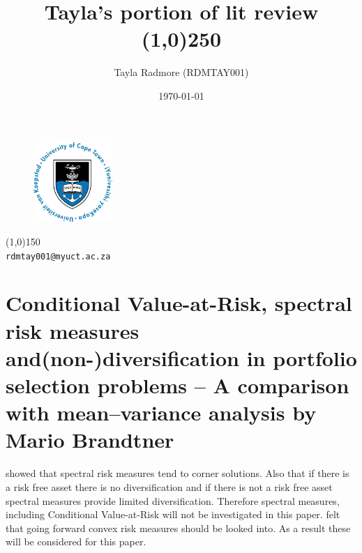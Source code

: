\documentclass[12pt,a4paper]{article}
\begin{document}
\begin{titlepage}

\title{Tayla's portion of lit review\\
\line(1,0){250}\\}

\date{\today}

\author{Tayla Radmore (RDMTAY001)}

\maketitle

\begin{figure}

\begin{center}
\includegraphics[width=3cm]{UCTlogo.jpg}\\[1cm]
\end{center}

\end{figure}

\begin{center}
\line(1,0){150}\\
{{\tt rdmtay001@myuct.ac.za}}
\end{center}

\thispagestyle{empty}

\end{titlepage}


\tableofcontents

\newpage


\section{Conditional Value-at-Risk, spectral risk measures and(non-)diversification in portfolio selection problems – A comparison with mean–variance analysis by Mario Brandtner}
\label{sec:1}

\cite{BRANDTNER20135526} showed that spectral risk measures tend to corner solutions. Also that if there is a risk free asset there is no diversification and if there is not a risk free asset spectral measures provide limited diversification. Therefore spectral measures, including Conditional Value-at-Risk will not be investigated in this paper. \cite{BRANDTNER20135526} felt that going forward convex risk measures should be looked into. As a result these will be considered for this paper.
\end{document}
